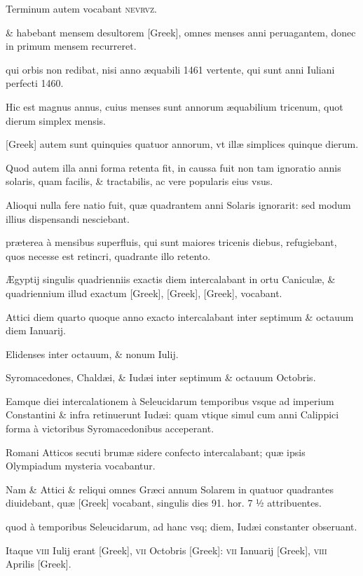 \begin{parnumbers}

Terminum autem vocabant \textsc{nevrvz}.

\& habebant mensem desultorem
\textgreek{[Greek]}, omnes menses anni peruagantem, donec in primum
mensem recurreret.

qui orbis non redibat, nisi anno æquabili 1461
vertente, qui sunt anni Iuliani perfecti 1460.

Hic est magnus annus,
cuius menses sunt annorum æquabilium tricenum, quot dierum simplex
mensis.

\textgreek{[Greek]} autem sunt quinquies quatuor annorum, vt
illæ simplices quinque dierum.

Quod autem illa anni forma retenta
fit, in caussa fuit non tam ignoratio annis solaris,
 quam facilis, \& tractabilis, ac vere popularis eius vsus.

Alioqui nulla fere natio fuit, quæ
quadrantem anni Solaris ignorarit: sed modum illius dispensandi
nesciebant.

præterea à mensibus superfluis, qui sunt maiores tricenis
diebus, refugiebant, quos necesse est retincri,
 quadrante illo retento.

Ægyptij singulis quadrienniis exactis diem intercalabant in ortu Caniculæ,
\& quadriennium illud exactum \textgreek{[Greek]}, \textgreek{[Greek]},
\textgreek{[Greek]}, vocabant.

Attici diem quarto quoque anno exacto intercalabant
inter septimum \& octauum diem Ianuarij.

Elidenses inter
octauum, \& nonum Iulij.

Syromacedones, Chaldæi, \& Iudæi inter
septimum \& octauum Octobris.

Eamque diei intercalationem à Seleucidarum
temporibus vsque ad imperium Constantini \& infra retinuerunt
Iudæi: quam vtique simul cum anni Calippici forma à victoribus
Syromacedonibus acceperant.

Romani Atticos secuti brumæ
sidere confecto intercalabant; quæ ipsis Olympiadum mysteria vocabantur.

Nam \& Attici \& reliqui omnes Græci annum Solarem in
quatuor quadrantes diuidebant, quæ \textgreek{[Greek]}
 vocabant, singulis dies 91.
hor. 7 ½ attribuentes.

quod à temporibus Seleucidarum, ad hanc vsq;
diem, Iudæi constanter obseruant.

Itaque \textsc{viii} Iulij erant \textgreek{[Greek]},
\textsc{vii} Octobris \textgreek{[Greek]}:
 \textsc{vii} Ianuarij \textgreek{[Greek]}, \textsc{viii}
Aprilis \textgreek{[Greek]}.


\end{parnumbers}
